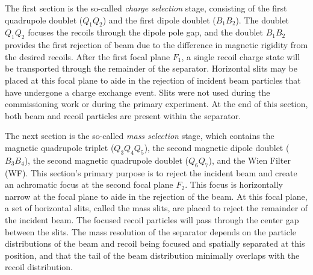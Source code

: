 The first section is the so-called \textit{charge selection} stage,
consisting of the first quadrupole doublet ($Q_1Q_2$) and the first
dipole doublet ($B_1B_2$). The doublet $Q_1Q_2$ focuses the recoils
through the dipole pole gap, and the doublet $B_1B_2$ provides the first
rejection of beam due to the difference in magnetic rigidity from the
desired recoils. After the first focal plane $F_1$, a single recoil
charge state will be transported through the remainder of the separator.
Horizontal slits may be placed at this focal plane to aide in the
rejection of incident beam particles that have undergone a charge
exchange event. Slits were not used during the commissioning work or
during the primary experiment. At the end of this section, both beam and
recoil particles are present within the separator.

The next section is the so-called \textit{mass selection} stage, which
contains the magnetic quadrupole triplet ($Q_3Q_4Q_5$), the second
magnetic dipole doublet ($B_3B_4$), the second magnetic quadrupole
doublet ($Q_6Q_7$), and the Wien Filter (WF). This section's primary
purpose is to reject the incident beam and create an achromatic focus at
the second focal plane $F_2$. This focus is horizontally narrow at the
focal plane to aide in the rejection of the beam. At this focal plane, a
set of horizontal slits, called the mass slits, are placed to reject the
remainder of the incident beam. The focused recoil particles will pass
through the center gap between the slits. The mass resolution of the
separator depends on the particle distributions of the beam and recoil
being focused and spatially separated at this position, and that the
tail of the beam distribution minimally overlaps with the recoil
distribution.

